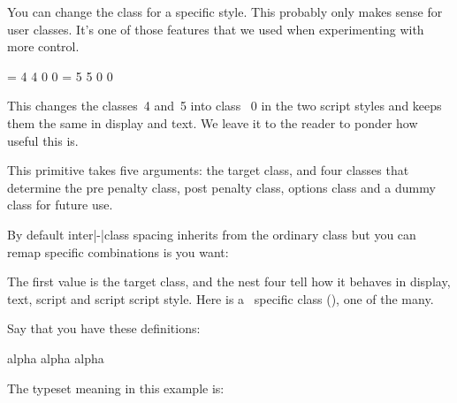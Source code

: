 You can change the class for a specific style. This probably only makes sense
for user classes. It's one of those features that we used when experimenting
with more control.

\starttyping
{} = 4 4 0 0
 = 5 5 0 0
\stoptyping

This changes the classes~4 and~5 into class~ 0 in the two script styles and keeps
them the same in display and text. We leave it to the reader to ponder how useful
this is.

\stopnewprimitive

\startnewprimitive[title={\prm {letmathparent}}]

This primitive takes five arguments: the target class, and four classes that
determine the pre penalty class, post penalty class, options class and a dummy
class for future use.

\stopnewprimitive

\startnewprimitive[title={\prm {letmathspacing}}]

By default inter|-|class spacing inherits from the ordinary class but you can
remap specific combinations is you want:

\starttyping
{} \mathfunctioncode
    \mathordinarycode \mathordinarycode
    \mathordinarycode \mathordinarycode
\stoptyping

The first value is the target class, and the nest four tell how it behaves in
display, text, script and script script style. Here \typ {\mathfunctioncode} is a
\CONTEXT\ specific class (\the\mathfunctioncode), one of the many.

\stopnewprimitive

\startnewprimitive[title={\prm {letprotected}}]

Say that you have these definitions:

\startbuffer
             \def  \MyMacroA{alpha}
\protected   {}
             \edef \MyMacroC{\MyMacroA\MyMacroB}
      \MyMacroA
             \edef \MyMacroD{\MyMacroA\MyMacroB}
\meaning           \MyMacroC\crlf
\meaning           \MyMacroD\par
\stopbuffer

\typebuffer

The typeset meaning in this example is:

{\tttf \getbuffer}

\stopnewprimitive

\startnewprimitive[title={\prm {lettolastnamedcs}}]

